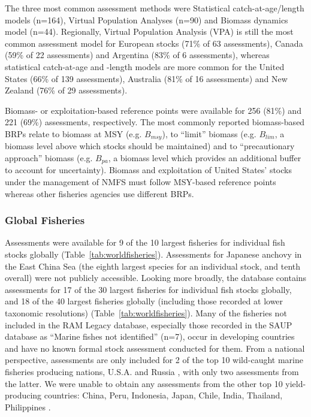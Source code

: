 The three most common assessment methods were
Statistical catch-at-age/length models (n=164), Virtual Population Analyses (n=90) and
Biomass dynamics model (n=44). Regionally, Virtual Population Analysis
(VPA) is still the most common assessment model for European stocks
(71\% of 63 assessments),
Canada (59\% of 22
assessments) and Argentina (83\% of
6 assessments), whereas statistical catch-at-age
and -length models are more common for the United States
(66\% of 139 assessments),
Australia (81\% of 16
assessments) and New Zealand (76\% of
29 assessments).

Biomass- or exploitation-based reference points were available for
256 (81\%) and
221 (69\%)
assessments, respectively. The most commonly reported biomass-based
BRPs relate to biomass at MSY (e.g. $B_{msy}$), to ``limit'' biomass
(e.g. $B_{lim}$, a biomass level above which stocks should be
maintained) and to ``precautionary approach'' biomass (e.g.  $B_{pa}$,
a biomass level which provides an additional buffer to account for
uncertainty). Biomass and exploitation of United States' stocks under
the management of NMFS must follow MSY-based reference points whereas
other fisheries agencies use different BRPs.

\subsubsection*{Global Fisheries}
Assessments were available for 9 of the 10 largest fisheries for
individual fish stocks globally (Table~\ref{tab:worldfisheries}).
Assessments for Japanese anchovy in the East China Sea (the eighth largest species
for an individual stock, and tenth overall) were not publicly
accessible. Looking more broadly, the database contains assessments
for 17 of the 30 largest fisheries for individual fish stocks
globally, and 18 of the 40 largest fisheries globally (including those
recorded at lower taxonomic resolutions)
(Table~\ref{tab:worldfisheries}). Many of the fisheries not included
in the RAM Legacy database, especially those recorded in the SAUP
database as ``Marine fishes not identified'' (n=7), occur in
developing countries and have no known formal stock assessment
conducted for them.  From a national perspective, assessments are only
included for 2 of the top 10 wild-caught marine fisheries producing
nations, U.S.A. and Russia \citep{FAO:sofia}, with only two
assessments from the latter. We were unable to obtain any assessments
from the other top 10 yield-producing countries: China, Peru,
Indonesia, Japan, Chile, India, Thailand, Philippines
\citep{FAO:sofia}.


